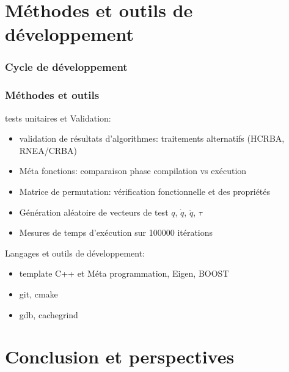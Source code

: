 \documentclass[10pt]{beamer}
\begin{document}
\section{Méthodes et outils de développement}

\begin{frame}
  \frametitle{Cycle de développement}
  
  
\end{frame}

\begin{frame}
  \frametitle{Méthodes et outils}
  
  tests unitaires et Validation:
  \begin{itemize}
		\item validation de résultats d'algorithmes: traitements alternatifs (HCRBA, RNEA/CRBA)
		\item Méta fonctions: comparaison phase compilation vs exécution
		\item Matrice de permutation: vérification fonctionnelle et des propriétés 
		\item Génération aléatoire de vecteurs de test $q$, $\dot{q}$, $\ddot{q}$, $\tau$
		\item Mesures de temps d'exécution sur 100000 itérations
  \end{itemize}
  
  \bigskip
  Langages et outils de développement:
  \begin{itemize}
  \item template C++ et Méta programmation, Eigen, BOOST
  \item git, cmake
  \item gdb, cachegrind
  \end{itemize}

\end{frame}


\section{Conclusion et perspectives}
\end{document}
